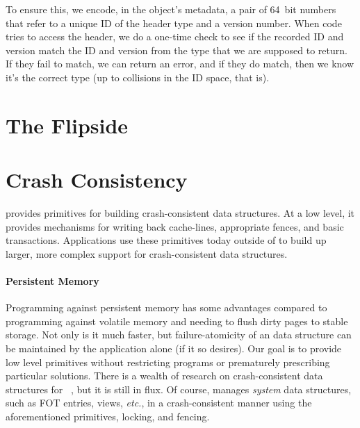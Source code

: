 To ensure this, we encode, in the object's metadata, a pair of 64~bit numbers that refer to a unique ID of the header
type and a version number. When code tries to access the header, we do a one-time check to see if the
recorded ID and version match the ID and version from the type that we are supposed to return. If they fail to match, we
can return an error, and if they do match, then we know it's the correct type (up to collisions in the ID space, that is).

\section{The Flipside}

\section{Crash Consistency}
\label{sec:crash}

\Twizzler provides primitives for building crash-consistent data structures. At a low level,
it provides mechanisms for writing back cache-lines, appropriate fences, and basic transactions.
Applications use these primitives today outside of \Twizzler to build up larger, more complex support for
crash-consistent data structures.


\paragraph{Persistent Memory}

Programming against persistent memory has some advantages compared to programming against volatile memory and needing to
flush dirty pages to stable storage. Not only is it much faster, but failure-atomicity of an \NVM data structure can be
maintained by the application alone (if it so desires).
Our goal is to provide low level primitives without restricting programs or prematurely
prescribing particular solutions. There is a wealth of research on crash-consistent
data structures for
\NVM~\cite{condit:sosp09,coburn:asplos11,volos:asplos11,dulloor:eurosys14,narayanan:asplos12,ni:hotstorage18,ni:micro19,ogleari:hpca18,lu2014loose},
but it is still in flux. Of course, \Twizzler manages \emph{system} data structures,
such as FOT entries, views, \emph{etc.}, in a
crash-consistent manner using the aforementioned primitives, locking, and fencing.

